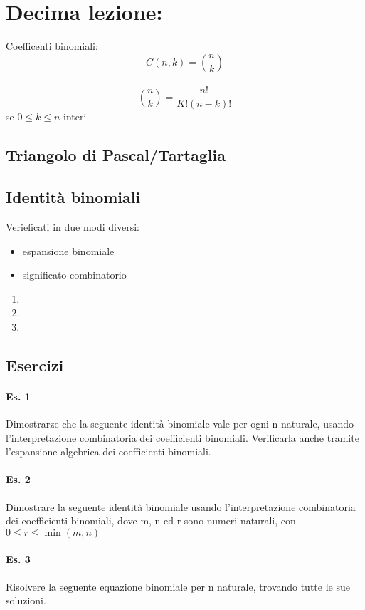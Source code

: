 \section{Decima lezione:}
Coefficenti binomiali: \[C(n,k) =  \binom{n}{k} \]
\\
\[ \binom{n}{k} = \frac{n!}{K!(n-k)!}\] se \( 0 \leq k \leq n\) interi.
\subsection{Triangolo di Pascal/Tartaglia}

\subsection{Identità binomiali} 
Verieficati in due modi diversi: 
\begin{itemize}
    \item espansione binomiale 
    \item significato combinatorio
\end{itemize}

\begin{enumerate}
    \item 
    \item 
    \item 
\end{enumerate}

\subsection{Esercizi}

\paragraph{Es. 1} Dimostrarze che la seguente identità binomiale vale per ogni n naturale,
usando l'interpretazione combinatoria dei coefficienti binomiali.
Verificarla anche tramite l'espansione algebrica dei coefficienti binomiali.

\paragraph{Es. 2} Dimostrare la seguente identità binomiale usando l'interpretazione combinatoria dei
coefficienti binomiali, dove m, n ed r sono numeri naturali, con \(0 \leq r \leq \min (m,n)\)

\paragraph{Es. 3} %
Risolvere la seguente equazione binomiale per n naturale, trovando tutte le sue soluzioni.

